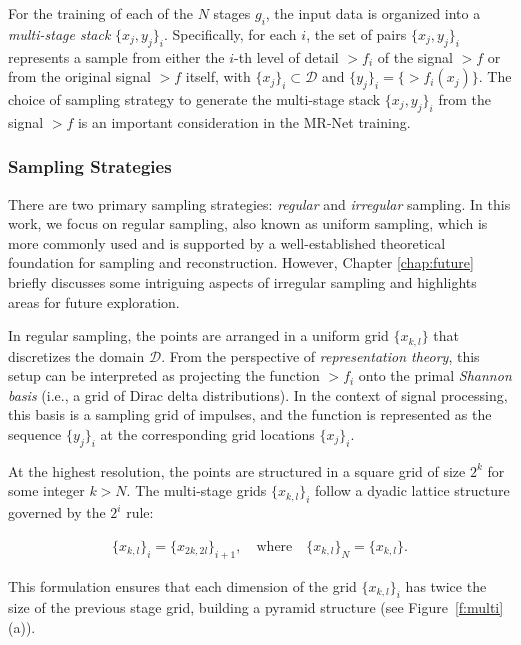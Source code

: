 For the training of each of the \( N \) stages \( g_i \), the input data is organized into a \textit{multi-stage stack} \(\{x_j, y_j\}_i\). Specifically, for each \( i \), the set of pairs \(\{x_j, y_j\}_i\) represents a sample from either the \( i \)-th level of detail \(\gt{f}_i\) of the signal \(\gt{f}\) or from the original signal \(\gt{f}\) itself, with \(\{x_j\}_i \subset \mathcal{D}\) and \(\{y_j\}_i = \{\gt{f}_i(x_j)\}\). The choice of sampling strategy to generate the multi-stage stack \(\{x_j, y_j\}_i\) from the signal \(\gt{f}\) is an important consideration in the MR-Net training.


\subsubsection{Sampling Strategies}

There are two primary sampling strategies: \textit{regular} and \textit{irregular} sampling. In this work, we focus on regular sampling, also known as uniform sampling, which is more commonly used and is supported by a well-established theoretical foundation for sampling and reconstruction. However, Chapter \ref{chap:future} briefly discusses some intriguing aspects of irregular sampling and highlights areas for future exploration.

In regular sampling, the points are arranged in a uniform grid \(\{x_{k,l}\}\) that discretizes the domain \(\mathcal{D}\). From the perspective of \textit{representation theory}, this setup can be interpreted as projecting the function \(\gt{f}_i\) onto the primal \textit{Shannon basis} (i.e., a grid of Dirac delta distributions). In the context of signal processing, this basis is a sampling grid of impulses, and the function is represented as the sequence \(\{y_j\}_i\) at the corresponding grid locations \(\{x_j\}_i\).

At the highest resolution, the points are structured in a square grid of size \( 2^k \) for some integer \( k > N \). The multi-stage grids \(\{x_{k,l}\}_i\) follow a dyadic lattice structure governed by the \( 2^i \) rule:

\begin{align}
    \{x_{k,l}\}_i = \{x_{2k, 2l}\}_{i+1}, \quad \text{where} \quad \{x_{k,l}\}_N = \{x_{k,l}\}.
\end{align}


This formulation ensures that each dimension of the grid \(\{x_{k,l}\}_i\) has twice the size of the previous stage grid, building a pyramid structure (see Figure~\ref{f:multi}(a)).

